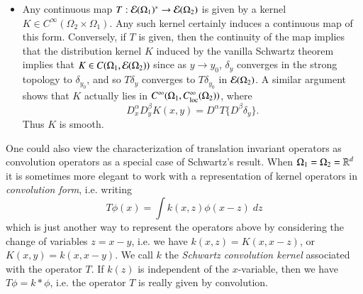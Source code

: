\begin{remark}
\begin{itemize}
        \item Any continuous map $T: \operatorname{\mathcal{E}}(\Omega_1)^* \to \operatorname{\mathcal{E}}(\Omega_2)$ is given by a kernel $K \in C^\infty(\Omega_2 \times \Omega_1)$. Any such kernel certainly induces a continuous map of this form. Conversely, if $T$ is given, then the continuity of the map implies that the distribution kernel $K$ induced by the vanilla Schwartz theorem implies that $K \in C(\Omega_1, \operatorname{\mathcal{E}}(\Omega_2))$ since as $y \to y_0$, $\delta_y$ converges in the strong topology to $\delta_{y_0}$, and so $T \delta_y$ converges to $T \delta_{y_0}$ in $\operatorname{\mathcal{E}}(\Omega_2)$. A similar argument shows that $K$ actually lies in $C^\infty(\Omega_1, C^\infty_{\text{loc}}(\Omega_2))$, where
        \[ D^\alpha_x D^\beta_y K(x,y) = D^\alpha T \{ D^\beta \delta_y \}. \]
        Thus $K$ is smooth.
    \end{itemize}
    One could also view the characterization of translation invariant operators as convolution operators as a special case of Schwartz's result. When $\Omega_1 = \Omega_2 = \operatorname{\mathbb{R}}^d$ it is sometimes more elegant to work with a representation of kernel operators in \emph{convolution form}, i.e. writing
    \[ T \phi(x) = \int k(x,z) \phi(x-z)\; dz \]
    which is just another way to represent the operators above by considering the change of variables $z = x - y$, i.e. we have $k(x,z) = K(x,x-z)$, or $K(x,y) = k(x,x-y)$. We call $k$ the \emph{Schwartz convolution kernel} associated with the operator $T$. If $k(z)$ is independent of the $x$-variable, then we have $T \phi = k * \phi$, i.e. the operator $T$ is really given by convolution.
\end{remark}

